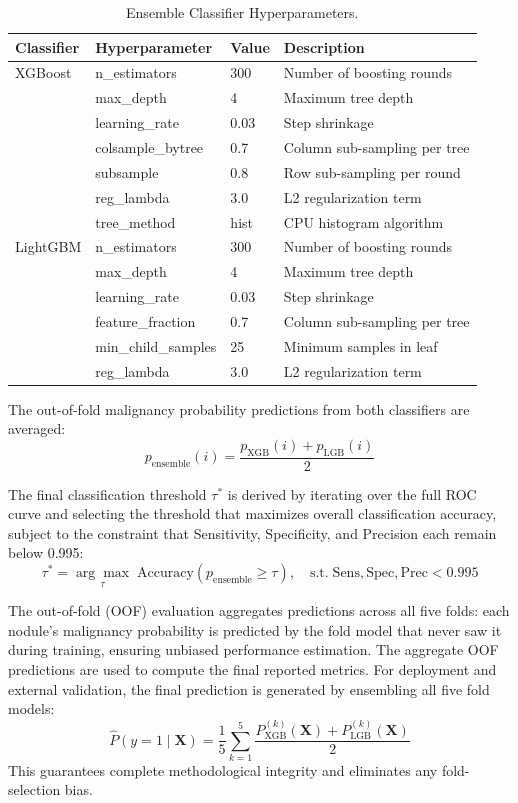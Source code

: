 \documentclass{iopjournal}
\begin{document}
\begin{table}[h]
\color{revblue}
\centering
\caption{Ensemble Classifier Hyperparameters.}\label{tab:hyperparams}
\begin{tabular}{llll}
\toprule
\textbf{Classifier} & \textbf{Hyperparameter} & \textbf{Value} &
\textbf{Description} \\
\midrule
XGBoost & n\_estimators & 300 & Number of boosting rounds \\
        & max\_depth & 4 & Maximum tree depth \\
        & learning\_rate & 0.03 & Step shrinkage \\
        & colsample\_bytree & 0.7 & Column sub-sampling per tree \\
        & subsample & 0.8 & Row sub-sampling per round \\
        & reg\_lambda & 3.0 & L2 regularization term \\
        & tree\_method & hist & CPU histogram algorithm \\
\midrule
LightGBM & n\_estimators & 300 & Number of boosting rounds \\
         & max\_depth & 4 & Maximum tree depth \\
         & learning\_rate & 0.03 & Step shrinkage \\
         & feature\_fraction & 0.7 & Column sub-sampling per tree \\
         & min\_child\_samples & 25 & Minimum samples in leaf \\
         & reg\_lambda & 3.0 & L2 regularization term \\
\bottomrule
\end{tabular}
\end{table}

The out-of-fold malignancy probability predictions from both classifiers are
averaged:
\[
p_{\mathrm{ensemble}}(i) = \frac{p_{\mathrm{XGB}}(i)+p_{\mathrm{LGB}}(i)}{2}
\]

{\color{revblue}The final classification threshold $\tau^*$ is derived by iterating over the
full ROC curve and selecting the threshold that maximizes overall classification
accuracy, subject to the constraint that Sensitivity, Specificity, and Precision
each remain below 0.995:
\[
\tau^* = \underset{\tau}{\arg\max}\;\mathrm{Accuracy}(p_{\mathrm{ensemble}}
\geq\tau), \quad \mathrm{s.t.}\;\mathrm{Sens},\mathrm{Spec},\mathrm{Prec}<0.995
\]

The out-of-fold (OOF) evaluation aggregates predictions across all five folds:
each nodule's malignancy probability is predicted by the fold model that never
saw it during training, ensuring unbiased performance estimation. The aggregate
OOF predictions are used to compute the final reported metrics. For deployment
and external validation, the final prediction is generated by ensembling all
five fold models:
\[
\hat{P}(y=1 \mid \mathbf{X}) = \frac{1}{5}\sum_{k=1}^{5}
\frac{P^{(k)}_{\mathrm{XGB}}(\mathbf{X})+P^{(k)}_{\mathrm{LGB}}(\mathbf{X})}{2}
\]
This guarantees complete methodological integrity and eliminates any
fold-selection bias.}
\end{document}
